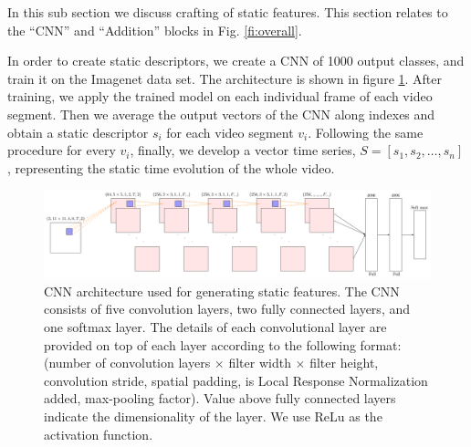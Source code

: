 In this sub section we discuss crafting of static features. This section relates to
the ``CNN'' and ``Addition'' blocks in Fig. \ref{fi:overall}.

In order to create static descriptors, we create a CNN of 1000 output classes, and train it on the Imagenet data set. The architecture is shown in figure \ref{fi:cnn}.
After training, we apply the trained model on each individual frame of each video segment. Then we average the output vectors of the CNN
along indexes and obtain a static descriptor $s_{i}$ for each video segment $v_{i}$. Following the same
procedure for every $v_{i}$, finally, we develop a vector time series,
$S =[s_{1}, s_{2}, \dots, s_{n}]$, representing the static time evolution of the whole video.

\begin{figure}
  \centering
  \includegraphics[scale=0.5]{./figures/nw.pdf}
  \caption{CNN architecture used for generating static features. The CNN consists of five convolution layers,
  two fully connected layers, and one softmax layer. The details of each convolutional layer are provided on top of each layer
  according to the following format:(number of convolution layers $\times$ filter width $\times$ filter height, convolution stride,
  spatial padding, is Local Response Normalization added, max-pooling factor). Value above fully connected layers indicate the dimensionality of the layer.
  We use ReLu as the activation function.}
\label{fi:cnn}
\end{figure} 